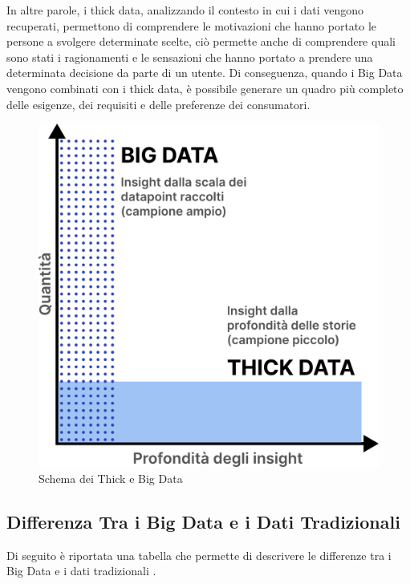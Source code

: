 In altre parole, i thick data, analizzando il contesto in cui i dati vengono recuperati, permettono di comprendere le motivazioni che hanno portato le persone a svolgere determinate scelte, ciò permette anche di comprendere quali sono stati i ragionamenti e le sensazioni che hanno portato a prendere una determinata decisione da parte di un utente. Di conseguenza, quando i Big Data vengono combinati con i thick data, è possibile generare un quadro più completo delle esigenze, dei requisiti e delle preferenze dei consumatori.

\begin{figure}[h!]
    \centering
    \includegraphics[width=0.5\linewidth]{figure/capitolo_2/Thick and Big Data.pdf}
    \caption{Schema dei Thick e Big Data}
    \label{fig:Thick and Big Data}
\end{figure}

\subsection{Differenza Tra i Big Data e i Dati Tradizionali}

Di seguito è riportata una tabella che permette di descrivere le differenze tra i Big Data e i dati tradizionali \cite{big_vs_traditional_data}.


